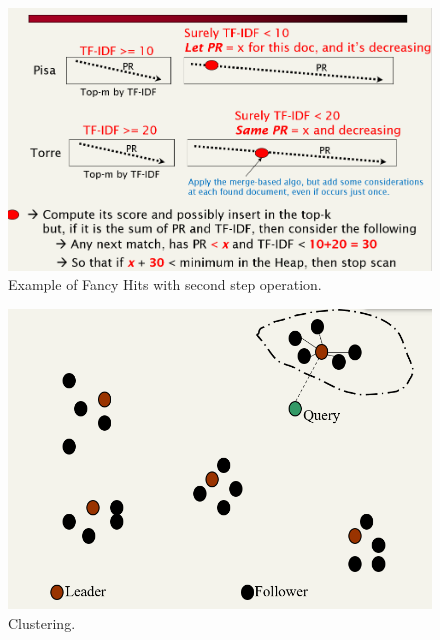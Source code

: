 \begin{figure}
    \centering
    \includegraphics[width=\linewidth]{images/fancyhits3.PNG}
    \caption{Example of Fancy Hits with second step operation.}
    \label{fig:fancyhits3}
\end{figure}
\begin{figure}
    \centering
    \includegraphics[width=0.75\linewidth]{images/clustering.PNG}
    \caption{Clustering.}
    \label{fig:clustering}
\end{figure}
